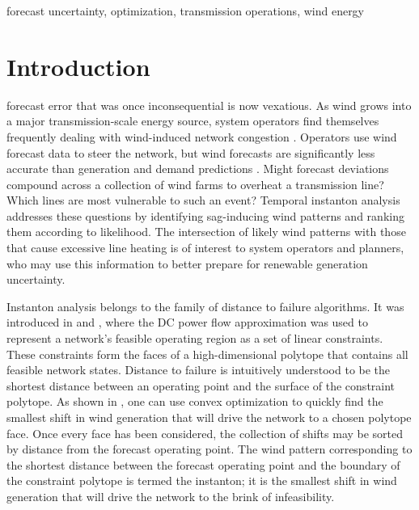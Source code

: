 \documentclass[journal,twoside]{IEEEtran}
\begin{document}
\begin{IEEEkeywords}
forecast uncertainty, optimization, transmission operations, wind energy
\end{IEEEkeywords}

%
\IEEEpeerreviewmaketitle

\section{Introduction}\label{sec:intro}
 forecast error that was once inconsequential is now vexatious. As wind grows into a major transmission-scale energy source, system operators find themselves frequently dealing with wind-induced network congestion \cite{rogers2010}. Operators use wind forecast data to steer the network, but wind forecasts are significantly less accurate than generation and demand predictions \cite{parsons2004}. Might forecast deviations compound across a collection of wind farms to overheat a transmission line? Which lines are most vulnerable to such an event? Temporal instanton analysis addresses these questions by identifying sag-inducing wind patterns and ranking them according to likelihood. The intersection of likely wind patterns with those that cause excessive line heating is of interest to system operators and planners, who may use this information to better prepare for renewable generation uncertainty.

Instanton analysis belongs to the family of distance to failure algorithms. It was introduced in \cite{chertkov2011} and \cite{chertkov2011a}, where the DC power flow approximation was used to represent a network's feasible operating region as a set of linear constraints. These constraints form the faces of a high-dimensional polytope that contains all feasible network states. Distance to failure is intuitively understood to be the shortest distance between an operating point and the surface of the constraint polytope. As shown in \cite{chertkov2011a}, one can use convex optimization to quickly find the smallest shift in wind generation that will drive the network to a chosen polytope face. Once every face has been considered, the collection of shifts may be sorted by distance from the forecast operating point. The wind pattern corresponding to the shortest distance between the forecast operating point and the boundary of the constraint polytope is termed the instanton; it is the smallest shift in wind generation that will drive the network to the brink of infeasibility.
\end{document}
